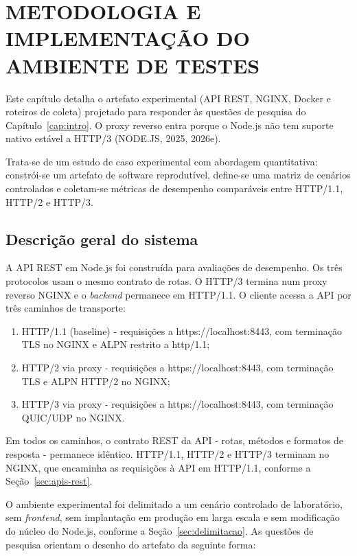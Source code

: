 ﻿\chapter{METODOLOGIA E IMPLEMENTAÇÃO DO AMBIENTE DE TESTES}\label{cap:metodologia}

Este capítulo detalha o artefato experimental (API REST, NGINX, Docker e roteiros de coleta) projetado para responder às questões de pesquisa do Capítulo~\ref{cap:intro}. O proxy reverso entra porque o Node.js não tem suporte nativo estável a HTTP/3 (NODE.JS, 2025, 2026e).

Trata-se de um estudo de caso experimental com abordagem quantitativa: constrói-se um artefato de software reprodutível, define-se uma matriz de cenários controlados e coletam-se métricas de desempenho comparáveis entre HTTP/1.1, HTTP/2 e HTTP/3.

\section{Descrição geral do sistema}

A API REST em Node.js foi construída para avaliações de desempenho. Os três protocolos usam o mesmo contrato de rotas. O HTTP/3 termina num proxy reverso NGINX e o \textit{backend} permanece em HTTP/1.1. O cliente acessa a API por três caminhos de transporte:

\begin{enumerate}[label=\alph*)]
\item HTTP/1.1 (baseline) - requisições a https://localhost:8443, com terminação TLS no NGINX e ALPN restrito a http/1.1;
\item HTTP/2 via proxy - requisições a https://localhost:8443, com terminação TLS e ALPN HTTP/2 no NGINX;
\item HTTP/3 via proxy - requisições a https://localhost:8443, com terminação QUIC/UDP no NGINX.
\end{enumerate}

Em todos os caminhos, o contrato REST da API - rotas, métodos e formatos de resposta - permanece idêntico. HTTP/1.1, HTTP/2 e HTTP/3 terminam no NGINX, que encaminha as requisições à API em HTTP/1.1, conforme a Seção~\ref{sec:apis-rest}.

O ambiente experimental foi delimitado a um cenário controlado de laboratório, sem \textit{frontend}, sem implantação em produção em larga escala e sem modificação do núcleo do Node.js, conforme a Seção~\ref{sec:delimitacao}. As questões de pesquisa orientam o desenho do artefato da seguinte forma:


